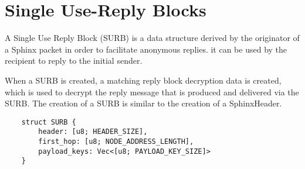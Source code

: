 \section{Single Use-Reply Blocks}\label{sec:surb}

A Single Use Reply Block (SURB) is a data structure derived by the originator of a Sphinx packet in order to facilitate anonymous replies. it can be used by the recipient to reply to the initial sender.


When a SURB is created, a matching reply block decryption data is created, which is used to decrypt the reply message that is produced and delivered via the SURB. The creation of a SURB is similar to the creation of a SphinxHeader.

\begin{verbatim}
    struct SURB {
        header: [u8; HEADER_SIZE],
        first_hop: [u8; NODE_ADDRESS_LENGTH],
        payload_keys: Vec<[u8; PAYLOAD_KEY_SIZE]>
    }
\end{verbatim}
